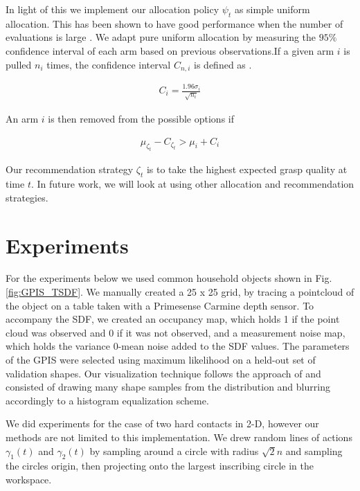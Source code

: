 \documentclass[letterpaper, 10 pt, conference]{ieeeconf}  %
\begin{document}
In light of this we implement our allocation policy $\psi_t$ as simple uniform allocation. This has been shown to have good performance when the number of evaluations is large \cite{bubeck2009pure}. We adapt pure uniform allocation by measuring the $95\%$ confidence interval of each arm based on previous observations.If a given arm $i$ is pulled $n_i$ times, the confidence interval $C_{n, i}$ is defined as \cite{caflisch1998monte}.

\vspace{-2ex}
\begin{align}
C_{ i} = \frac{1.96 \sigma_i}{\sqrt{n_i}}
\end{align}


An arm $i$ is then removed from the possible options if 

\vspace{-2ex}
\begin{align*}
\mu_{\zeta_t} - C_{\zeta_t} >   \mu_{i}+C_{i}
\end{align*}

Our recommendation strategy $\zeta_t$ is to take the highest expected grasp quality at time $t$. In future work, we will look at using other allocation and recommendation strategies. 

\section{Experiments}
For the experiments below we used common household objects shown in Fig. \ref{fig:GPIS_TSDF}. We manually created a 25 x 25 grid, by tracing a pointcloud of the object on a table taken with a Primesense Carmine depth sensor. To accompany the SDF, we created an occupancy map, which holds 1 if the point cloud was observed and 0 if it was not observed, and a measurement noise map, which holds the variance 0-mean noise added to the SDF values. The parameters of the GPIS were selected using maximum likelihood on a held-out set of validation shapes. Our visualization technique follows the approach of \cite{jeffs} and consisted of drawing many shape samples from the distribution and blurring accordingly to a histogram equalization scheme. 

We did experiments for the case of two hard contacts in 2-D, however our methods are not limited to this implementation. We drew random lines of actions $\gamma_1(t)$ and $\gamma_2(t)$ by sampling around a circle with radius $\sqrt{2}n$ and sampling the circles origin, then projecting onto the largest inscribing circle in the workspace. 
\end{document}
